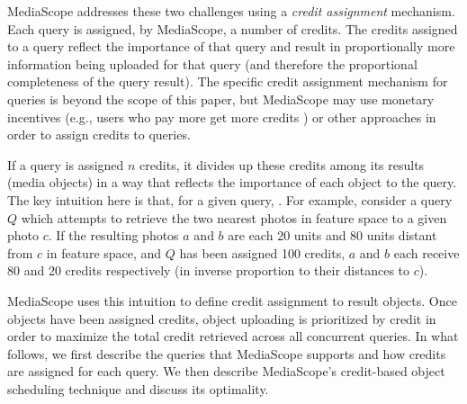 
MediaScope addresses these two challenges using a \emph{credit
  assignment} mechanism.
%
Each query is assigned, by MediaScope, a number of credits.
%
The credits assigned to a query reflect the importance of that query
and result in proportionally more information being uploaded for that
query (and therefore the proportional completeness of the query result).
%
The specific credit assignment mechanism for queries is beyond the
scope of this paper, but MediaScope may use monetary incentives (e.g.,
users who pay more get more credits ) or other
approaches in order to assign credits to queries.

If a query is assigned $n$ credits, it divides up these credits among
its results (media objects) in a way that reflects the importance of
each object to the query.
%
The key intuition here is that, for a given query, .
%
For example, consider a query $Q$ which attempts to retrieve the two
nearest photos in feature space to a given photo $c$.
%
If the resulting photos $a$ and $b$ are each 20 units and 80 units
distant from $c$ in feature space, and $Q$ has been assigned 100
credits, $a$ and $b$ each receive 80 and 20 credits respectively (in
inverse proportion to their distances to $c$).
%

MediaScope uses this intuition to define credit assignment to result
objects.
%
Once objects have been assigned credits, object uploading is
prioritized by credit in order to maximize the total credit retrieved
across all concurrent queries.
%
In what follows, we first describe the queries that MediaScope
supports and how credits are assigned for each query.
%
We then describe MediaScope's credit-based object scheduling technique
and discuss its optimality.


